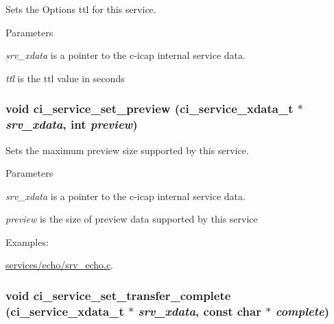 Sets the Options ttl for this service. 
\begin{DoxyParams}{Parameters}
\item[{\em srv\_\-xdata}]is a pointer to the c-\/icap internal service data. \item[{\em ttl}]is the ttl value in seconds \end{DoxyParams}
\hypertarget{group__SERVICES_ga4baea98d2181bfa07189e048a889542a}{
\subsubsection[{ci\_\-service\_\-set\_\-preview}]{\setlength{\rightskip}{0pt plus 5cm}void ci\_\-service\_\-set\_\-preview ({\bf ci\_\-service\_\-xdata\_\-t} $\ast$ {\em srv\_\-xdata}, \/  int {\em preview})}}
\label{group__SERVICES_ga4baea98d2181bfa07189e048a889542a}


Sets the maximum preview size supported by this service. 
\begin{DoxyParams}{Parameters}
\item[{\em srv\_\-xdata}]is a pointer to the c-\/icap internal service data. \item[{\em preview}]is the size of preview data supported by this service \end{DoxyParams}
\begin{Desc}
\item[Examples: ]\par
\hyperlink{services_2echo_2srv__echo_8c-example}{services/echo/srv\_\-echo.c}.\end{Desc}
\hypertarget{group__SERVICES_ga8390e88b95e0100d1a2728902f1d779b}{
\subsubsection[{ci\_\-service\_\-set\_\-transfer\_\-complete}]{\setlength{\rightskip}{0pt plus 5cm}void ci\_\-service\_\-set\_\-transfer\_\-complete ({\bf ci\_\-service\_\-xdata\_\-t} $\ast$ {\em srv\_\-xdata}, \/  const char $\ast$ {\em complete})}}
\label{group__SERVICES_ga8390e88b95e0100d1a2728902f1d779b}


